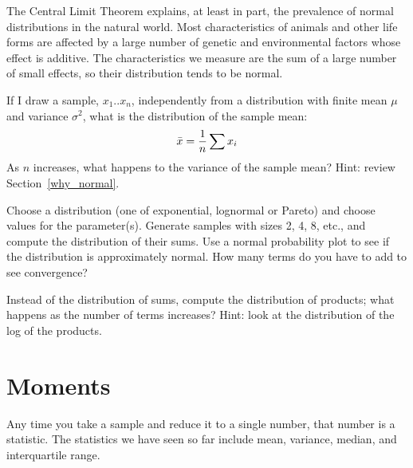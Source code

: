 \documentclass[12pt]{book}
\begin{document}
The Central Limit Theorem explains, at least in part, the prevalence
of normal distributions in the natural world.  Most characteristics of
animals and other life forms are affected by a large number of genetic
and environmental factors whose effect is additive.  The characteristics
we measure are the sum of a large number of small effects, so their
distribution tends to be normal.

\begin{exercise}
If I draw a sample, $x_{1} .. x_{n}$, independently from a
distribution with finite mean $\mu$ and variance $\sigma^2$, what is
the distribution of the sample mean:
%
\[ \bar{x} = \frac{1}{n} \sum x_i \]
%
As $n$ increases, what happens to the variance of the sample mean?
Hint: review Section~\ref{why_normal}.

\end{exercise}

\begin{exercise}
Choose a distribution (one of exponential, lognormal or Pareto) and
choose values for the parameter(s).  Generate samples with sizes
2, 4, 8, etc., and compute the distribution of their sums.  Use
a normal probability plot to see if the distribution is approximately
normal.  How many terms do you have to add to see convergence?

\end{exercise}


\begin{exercise}
Instead of the distribution of sums, compute the distribution of
products; what happens as the number of terms increases?
Hint: look at the distribution of the log of the products.

\end{exercise}


\section{Moments}

Any time you take a sample and reduce it to a single number, that
number is a statistic.  The statistics we have seen so far include
mean, variance, median, and interquartile range.
\end{document}
